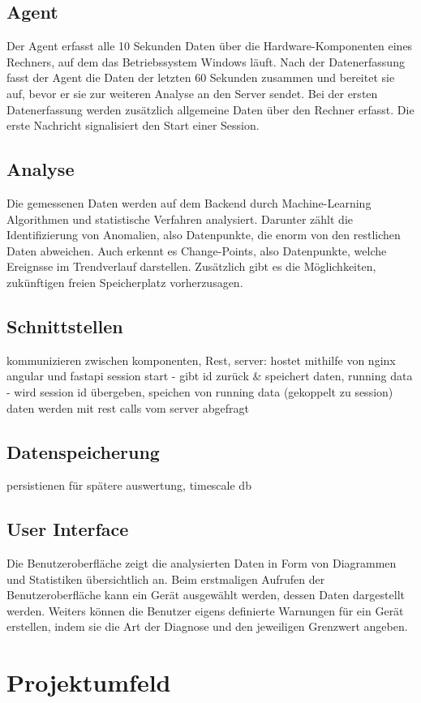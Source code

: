 \documentclass{report}
\begin{document}
\subsection{Agent}
Der Agent erfasst alle 10 Sekunden Daten über die Hardware-Komponenten eines Rechners, auf dem das Betriebssystem Windows läuft. Nach der Datenerfassung fasst der Agent die Daten der letzten 60 Sekunden zusammen und bereitet sie auf, bevor er sie zur weiteren Analyse an den Server sendet. Bei der ersten Datenerfassung werden zusätzlich allgemeine Daten über den Rechner erfasst. Die erste Nachricht signalisiert den Start einer Session. 
\subsection{Analyse}
Die gemessenen Daten werden auf dem Backend durch Machine-Learning Algorithmen und statistische Verfahren analysiert. Darunter zählt die Identifizierung von Anomalien, also Datenpunkte, die enorm von den restlichen Daten abweichen. Auch erkennt es Change-Points, also Datenpunkte, welche Ereignsse im Trendverlauf darstellen. Zusätzlich gibt es die Möglichkeiten, zukünftigen freien Speicherplatz vorherzusagen.
\subsection{Schnittstellen}
kommunizieren zwischen komponenten, Rest, server: hostet mithilfe von nginx angular und fastapi
session start - gibt id zurück & speichert daten, running data - wird session id übergeben, speichen von running data (gekoppelt zu session)
daten werden mit rest calls vom server abgefragt
\subsection{Datenspeicherung}
persistienen für spätere auswertung, timescale db 
\subsection{User Interface}
Die Benutzeroberfläche zeigt die analysierten Daten in Form von Diagrammen und Statistiken übersichtlich an. Beim erstmaligen Aufrufen der Benutzeroberfläche kann ein Gerät ausgewählt werden, dessen Daten dargestellt werden. Weiters können die Benutzer eigens definierte Warnungen für ein Gerät erstellen, indem sie die Art der Diagnose und den jeweiligen Grenzwert angeben.
\section{Projektumfeld}
\end{document}
